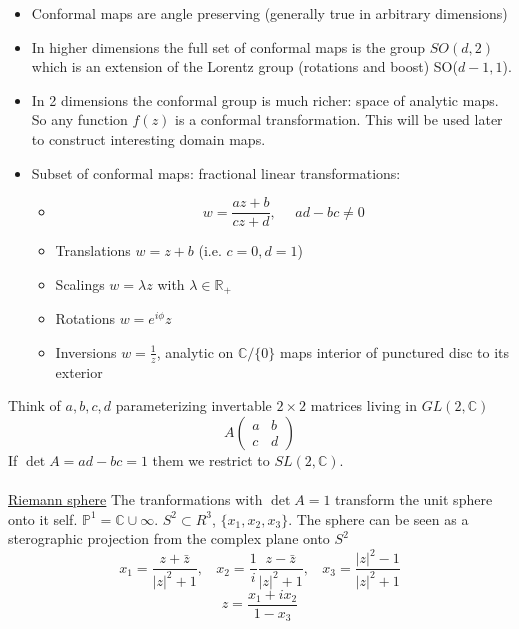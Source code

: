 \documentclass[a4paper,12pt]{article}
\begin{document}
\begin{itemize}
\item Conformal maps are angle preserving (generally true in arbitrary dimensions)
\item In higher dimensions the full set of conformal maps is the group $SO(d,2)$ which is an extension of the Lorentz group (rotations and boost) SO($d-1,1$).
\item In 2 dimensions the conformal group is much richer: space of analytic maps. So any function $f(z)$ is a conformal transformation. This will be used later to construct interesting domain maps.
\item Subset of conformal maps: fractional linear transformations:
\begin{itemize}
	\item \begin{equation}
		w=\frac{az+b}{cz+d},~~~~~~ad-bc\neq0
	\end{equation}
	\item Translations $w=z+b$ (i.e. $c=0,d=1$)
	\item Scalings $w=\lambda z$ with $\lambda\in \mathds{R}_+$
	\item Rotations $w=e^{i\phi}z$
	\item Inversions $w=\frac{1}{z}$, analytic on $\mathds{C}/\{0\}$ maps interior of punctured disc to its exterior
 \end{itemize}
\end{itemize}
Think of $a,b,c,d$ parameterizing invertable $2\times 2$ matrices living in $GL(2,\mathds{C})$
\begin{equation}
A\begin{pmatrix}
a & b \\c& d
\end{pmatrix}
\end{equation}
If $\det A=ad-bc=1$ them we restrict to $SL(2,\mathds{C})$. \\\\
\underline{Riemann sphere}
The tranformations with $\det A=1$ transform the unit sphere onto it self. $\mathds{P}^1=\mathds{C}\cup \infty$. $S^2\subset R^3$, $\{x_1,x_2,x_3\}$. The sphere can be seen as a sterographic projection from the complex plane onto $S^2$
\begin{equation}
x_1=\frac{z+\bar z}{|z|^2+1},~~~~x_2=\frac{1}{i}\frac{z-\bar z}{|z|^2+1},~~~~x_3=\frac{|z|^2-1}{|z|^2+1}
\end{equation}
\begin{equation}
z=\frac{x_1+ix_2}{1-x_3}
\end{equation}\\\\
\end{document}
